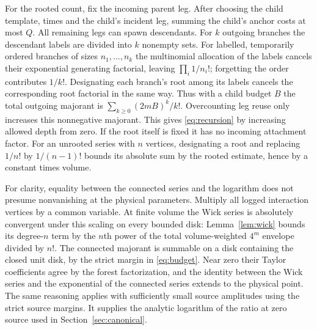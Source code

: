 \documentclass[11pt]{article}
\begin{document}
For the rooted count, fix the incoming parent leg. After choosing the child template, times and the child's incident leg, summing the child's anchor costs at most $Q$. All remaining legs can spawn descendants. For $k$ outgoing branches the descendant labels are divided into $k$ nonempty sets. For labelled, temporarily ordered branches of sizes $n_1,\ldots,n_k$ the multinomial allocation of the labels cancels their exponential generating factorial, leaving $\prod_i1/n_i!$; forgetting the order contributes $1/k!$. Designating each branch's root among its labels cancels the corresponding root factorial in the same way. Thus with a child budget $B$ the total outgoing majorant is $\sum_{k\ge0}(2mB)^k/k!$. Overcounting leg reuse only increases this nonnegative majorant. This gives \eqref{eq:recursion} by increasing allowed depth from zero. If the root itself is fixed it has no incoming attachment factor. For an unrooted series with $n$ vertices, designating a root and replacing $1/n!$ by $1/(n-1)!$ bounds its absolute sum by the rooted estimate, hence by a constant times volume.

For clarity, equality between the connected series and the logarithm does not presume nonvanishing at the physical parameters. Multiply all logged interaction vertices by a common variable. At finite volume the Wick series is absolutely convergent under this scaling on every bounded disk: Lemma~\ref{lem:wick} bounds its degree-$n$ term by the $n$th power of the total volume-weighted $4^m$ envelope divided by $n!$. The connected majorant is summable on a disk containing the closed unit disk, by the strict margin in \eqref{eq:budget}. Near zero their Taylor coefficients agree by the forest factorization, and the identity between the Wick series and the exponential of the connected series extends to the physical point. The same reasoning applies with sufficiently small source amplitudes using the strict source margins. It supplies the analytic logarithm of the ratio at zero source used in Section~\ref{sec:canonical}.
\end{document}
